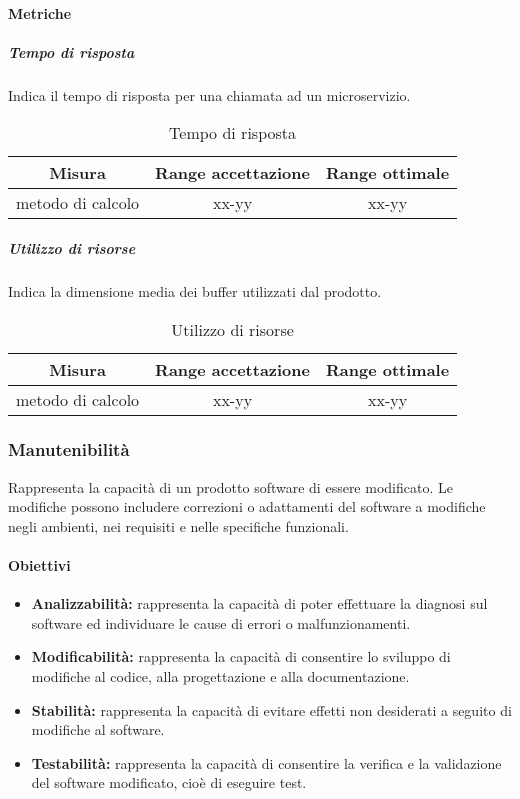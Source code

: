 		\paragraph{Metriche}
			\subparagraph{Tempo di risposta}
			Indica il tempo di risposta per una chiamata ad un microservizio.
			\begin{table}[H]
				\begin{center}
					\begin{tabular}{|c|c|c|}
						\hline
						\textbf{Misura} & \textbf{Range accettazione} & \textbf{Range ottimale} \\
						\hline
						metodo di calcolo & xx-yy  & xx-yy \\
						\hline
					\end{tabular}
				\end{center}
				\caption{Tempo di risposta}
			\end{table}
			
			\subparagraph{Utilizzo di risorse}
			Indica la dimensione media dei buffer utilizzati dal prodotto.
			\begin{table}[H]
				\begin{center}
					\begin{tabular}{|c|c|c|}
						\hline
						\textbf{Misura} & \textbf{Range accettazione} & \textbf{Range ottimale} \\
						\hline
						metodo di calcolo & xx-yy  & xx-yy \\
						\hline
					\end{tabular}
				\end{center}
				\caption{Utilizzo di risorse}
			\end{table}
			
	\subsubsection{Manutenibilità}
	Rappresenta la capacità di un prodotto software di essere modificato. Le modifiche possono includere correzioni o adattamenti del software a modifiche negli ambienti, nei requisiti e nelle specifiche funzionali.
	
		\paragraph{Obiettivi}
			\begin{itemize}
				\item \textbf{Analizzabilità:} rappresenta la capacità di poter effettuare la diagnosi sul software ed individuare le cause di errori o malfunzionamenti.
				\item \textbf{Modificabilità:} rappresenta la capacità di consentire lo sviluppo di modifiche al codice, alla progettazione e alla documentazione.
				\item \textbf{Stabilità:} rappresenta la capacità di evitare effetti non desiderati a seguito di modifiche al software.
				\item \textbf{Testabilità:} rappresenta la capacità di consentire la verifica e la validazione del software modificato, cioè di eseguire test.
			\end{itemize}
	
